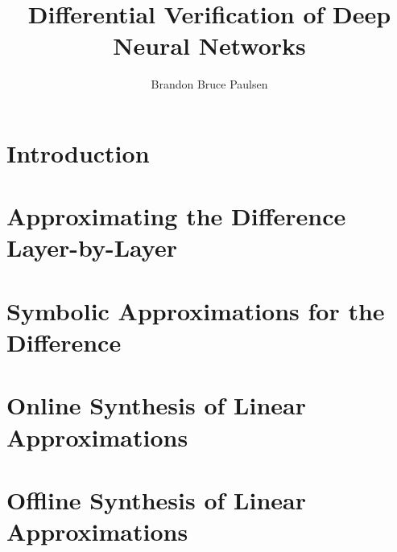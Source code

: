 \documentclass[11pt]{report}
\begin{document}
\title{Differential Verification of Deep Neural Networks}

\author{Brandon Bruce Paulsen}



\begin{preface}
  

  

  {
  \hypersetup{hidelinks} %
  \tableofcontents
  \listoftables
  \listoffigures
  }

  
\end{preface}

\chapter{Introduction}
  \label{ch:introduction}

\graphicspath{}


\chapter{Approximating the Difference Layer-by-Layer}
\label{ch:reludiff}



\chapter{Symbolic Approximations for the Difference}
\label{ch:neurodiff}


\chapter{Online Synthesis of Linear Approximations}
\label{ch:onlinesyn}


\chapter{Offline Synthesis of Linear Approximations}
\label{ch:offlinesyn}

\end{document}
